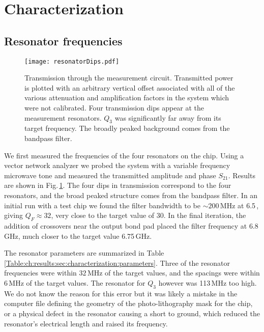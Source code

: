 \section{Characterization} \label{section:characterization}

\subsection{Resonator frequencies}

\begin{figure}
\begin{centering}
\texttt{[image: resonatorDips.pdf]}
\par\end{centering}
\caption{Transmission through the measurement circuit. Transmitted power is plotted with an arbitrary vertical offset associated with all of the various attenuation and amplification factors in the system which were not calibrated. Four transmission dips appear at the measurement resonators. $Q_3$ was significantly far away from its target frequency. The broadly peaked background comes from the bandpass filter.}
\label{Fig:ch:results:sec:characterization:resonatorDips}
\end{figure}

We first measured the frequencies of the four resonators on the chip.
Using a vector network analyzer we probed the system with a variable frequency microwave tone and measured the transmitted amplitude and phase $S_{21}$.
Results are shown in Fig.\,\ref{Fig:ch:results:sec:characterization:resonatorDips}.
The four dips in transmission correspond to the four resonators, and the broad peaked structure comes from the bandpass filter.
In an initial run with a test chip we found the filter bandwidth to be $\sim 200\,\text{MHz}$ at 6.5\,, giving $Q_F \approx 32$, very close to the target value of 30.
In the final iteration, the addition of crossovers near the output bond pad placed the filter frequency at 6.8\,GHz, much closer to the target value 6.75\,GHz.

The resonator parameters are summarized in Table \ref{Table:ch:results:sec:characterization:parameters}.
Three of the resonator frequencies were within $32\,\text{MHz}$ of the target values, and the spacings were within 6\,MHz of the target values.
The resonator for $Q_3$ however was 113\,MHz too high.
We do not know the reason for this error but it was likely a mistake in the computer file defining the geometry of the photo-lithography mask for the chip, or a physical defect in the resonator causing a short to ground, which reduced the resonator's electrical length and raised its frequency.


